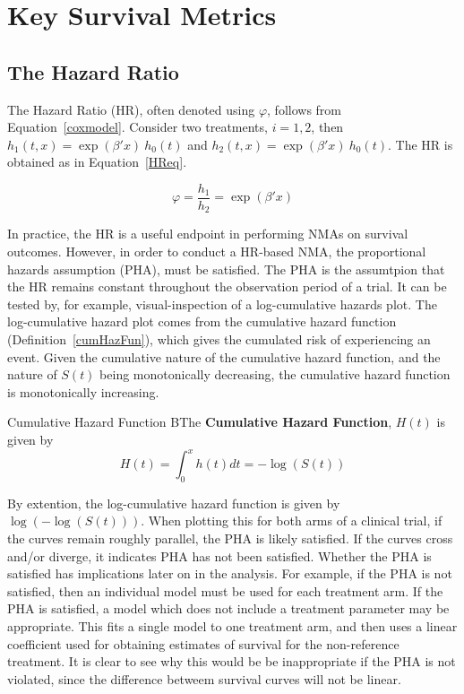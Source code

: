 \section{Key Survival Metrics}

\subsection{The Hazard Ratio}
The Hazard Ratio (HR), often denoted using $\varphi$, follows from Equation~\ref{coxmodel}. Consider two treatments, $i = 1, 2$, then $h_1(t, x) = \exp(\beta'x) \ h_0(t)$ and $h_2(t, x) = \exp(\beta'x) \ h_0(t)$. The HR is obtained as in Equation~\ref{HReq}.

\begin{equation}
    \varphi = \frac{h_1}{h_2} = \exp(\beta' x)
    \label{HReq}
\end{equation}

In practice, the HR is a useful endpoint in performing NMAs on survival outcomes. However, in order to conduct a HR-based NMA, the proportional hazards assumption (PHA), must be satisfied. The PHA is the assumtpion that the HR remains constant throughout the observation period of a trial. It can be tested by, for example, visual-inspection of a log-cumulative hazards plot. The log-cumulative hazard plot comes from the cumulative hazard function (Definition~\ref{cumHazFun}), which gives the cumulated risk of experiencing an event. Given the cumulative nature of the cumulative hazard function, and the nature of $S(t)$ being monotonically decreasing, the cumulative hazard function is monotonically increasing.

\begin{definition}[label=cumHazFun]{Cumulative Hazard Function}
    BThe \textbf{Cumulative Hazard Function}, $H(t)$ is given by 
    \begin{equation}
        H(t) = \int_{0}^{x}h(t)dt = -\log(S(t))  
    \end{equation}
\end{definition}

By extention, the log-cumulative hazard function is given by $\log(-\log(S(t)))$. When plotting this for both arms of a clinical trial, if the curves remain roughly parallel, the PHA is likely satisfied. If the curves cross and/or diverge, it indicates PHA has not been satisfied. Whether the PHA is satisfied has implications later on in the analysis. For example, if the PHA is not satisfied, then an individual model must be used for each treatment arm. If the PHA is satisfied, a model which does not include a treatment parameter may be appropriate. This fits a single model to one treatment arm, and then uses a linear coefficient used for obtaining estimates of survival for the non-reference treatment. It is clear to see why this would be be inappropriate if the PHA is not violated, since the difference betweem survival curves will not be linear. 

